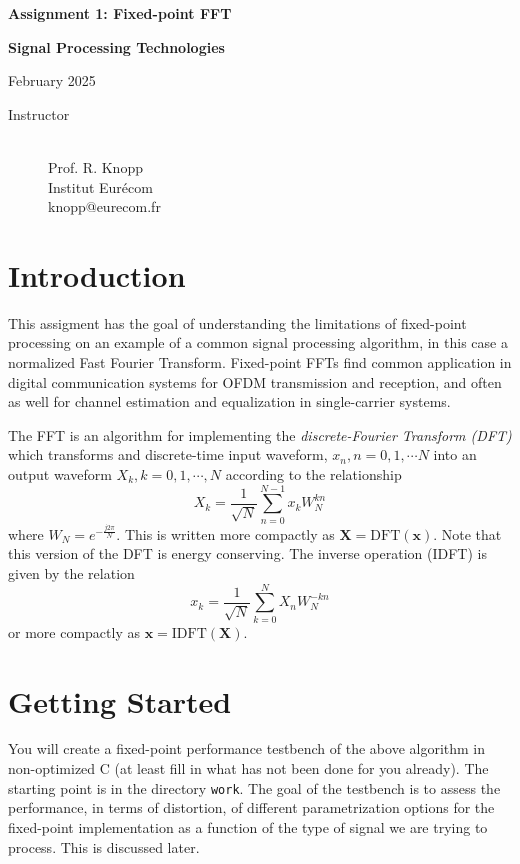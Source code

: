 \documentclass[11pt]{article}
\begin{document}
\parindent 0cm
\centerline{\Large\bf Assignment 1: Fixed-point FFT}
\centerline{\Large\bf Signal Processing Technologies}
\centerline{\large February 2025}
\makeatletter
\begin{description}
\item[Instructor] \mbox{}\\
Prof. R. Knopp\\
Institut Eur\'ecom\\
knopp@eurecom.fr
\end{description}
\section{Introduction}
This assigment has the goal of understanding the limitations of fixed-point processing on an 
example of a common signal processing algorithm, in this case a normalized Fast Fourier Transform.
Fixed-point FFTs find common application in digital communication systems for OFDM transmission and
reception, and often as well for channel estimation and equalization in single-carrier systems. 

The FFT is an algorithm for implementing the {\em discrete-Fourier Transform (DFT)} which transforms
and discrete-time input waveform, $x_{n}, n=0,1,\cdots N$ into an output waveform $X_{k}, k=0,1,\cdots,N$
according to the relationship
\begin{equation}
X_{k} = \frac{1}{\sqrt{N}}\sum_{n=0}^{N-1}x_{k}W_{N}^{kn}
\end{equation}
where $W_{N} = e^{-\frac{j2\pi}{N}}$.  This is written more compactly as $\mathbf{X} = \mathrm{DFT}(\mathbf{x})$. 
Note that this version of the DFT is energy conserving.  The inverse operation (IDFT) is given by the relation
\begin{equation}
x_{k} = \frac{1}{\sqrt{N}}\sum_{k=0}^{N}X_{n}W_{N}^{-kn}
\end{equation}
or more compactly as $\mathbf{x} = \mathrm{IDFT}(\mathbf{X})$.  

\section{Getting Started}

You will create a fixed-point performance testbench of the above algorithm in non-optimized C (at least fill in what
has not been done for you already). The starting point is in the directory {\tt work}.  The goal of the testbench is to
assess the performance, in terms of distortion, of different parametrization options for the fixed-point implementation
as a function of the type of signal we are trying to process.  This is discussed later.  
\end{document}
